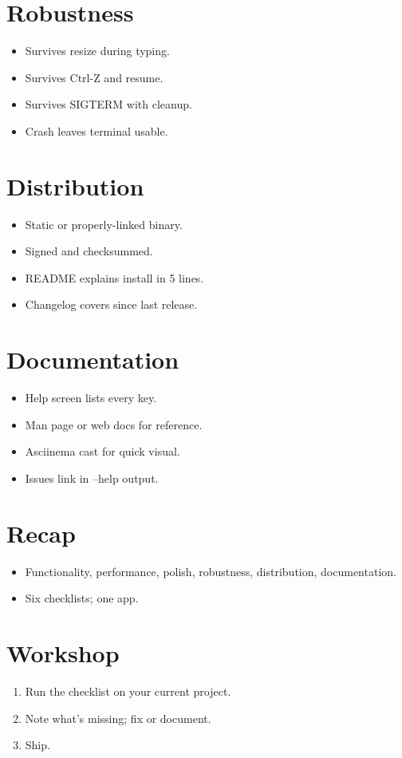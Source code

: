 \section{Robustness}

\begin{itemize}[leftmargin=*]
  \item Survives resize during typing.
  \item Survives Ctrl-Z and resume.
  \item Survives SIGTERM with cleanup.
  \item Crash leaves terminal usable.
\end{itemize}

\section{Distribution}

\begin{itemize}[leftmargin=*]
  \item Static or properly-linked binary.
  \item Signed and checksummed.
  \item README explains install in 5 lines.
  \item Changelog covers since last release.
\end{itemize}

\section{Documentation}

\begin{itemize}[leftmargin=*]
  \item Help screen lists every key.
  \item Man page or web docs for reference.
  \item Asciinema cast for quick visual.
  \item Issues link in --help output.
\end{itemize}

\section{Recap}

\begin{recap}
\begin{itemize}[leftmargin=*]
  \item Functionality, performance, polish, robustness,
    distribution, documentation.
  \item Six checklists; one app.
\end{itemize}
\end{recap}

\section*{Workshop}

\begin{enumerate}[leftmargin=*]
  \item Run the checklist on your current project.
  \item Note what's missing; fix or document.
  \item Ship.
\end{enumerate}

